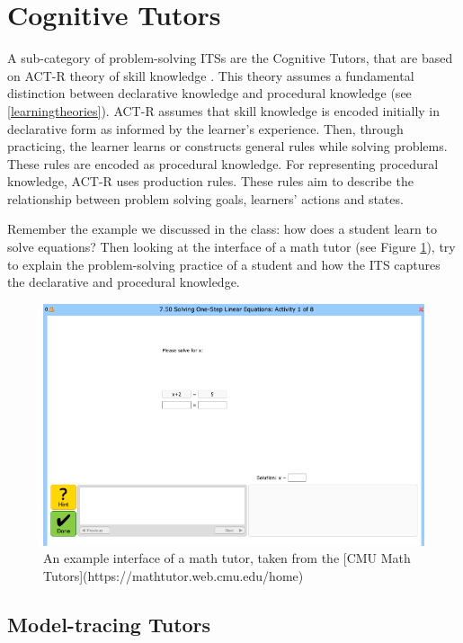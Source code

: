 \documentclass[
]{book}
\begin{document}
\section{Cognitive Tutors}\label{cognitive-tutors}

A sub-category of problem-solving ITSs are the Cognitive Tutors, that are based on ACT-R theory of skill knowledge \citep{anderson2013architecture}. This theory assumes a fundamental distinction between declarative knowledge and procedural knowledge (see \ref{learningtheories}). ACT-R assumes that skill knowledge is encoded initially in declarative form as informed by the learner's experience. Then, through practicing, the learner learns or constructs general rules while solving problems. These rules are encoded as procedural knowledge. For representing procedural knowledge, ACT-R uses production rules. These rules aim to describe the relationship between problem solving goals, learners' actions and states.

Remember the example we discussed in the class: how does a student learn to solve equations? Then looking at the interface of a math tutor (see Figure \ref{fig:mathtutor}), try to explain the problem-solving practice of a student and how the ITS captures the declarative and procedural knowledge.

\begin{figure}
\includegraphics[width=13cm]{./images/mathtutor} \caption{An example interface of a math tutor, taken from the [CMU Math Tutors](https://mathtutor.web.cmu.edu/home)}\label{fig:mathtutor}
\end{figure}

\subsection{Model-tracing Tutors}\label{model-tracing-tutors}
\end{document}
